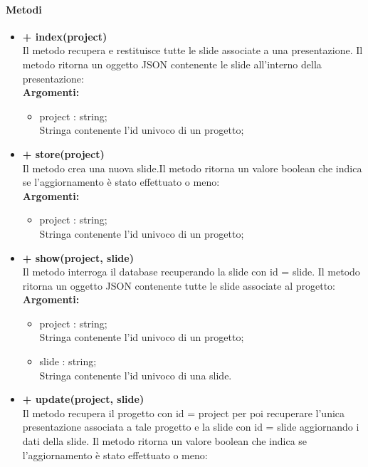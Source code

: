 	\paragraph{Metodi}
		\begin{itemize}
			\item \textbf{+ index(project)}\\
				Il metodo recupera e restituisce tutte le slide associate a una presentazione. Il metodo ritorna un oggetto JSON contenente le slide all'interno della presentazione:\\
				\textbf{Argomenti:}
				\begin{itemize}
					\item project : string; \\
					Stringa contenente l'id univoco di un progetto;
				\end{itemize}
			\item \textbf{+ store(project)}\\
				Il metodo crea una nuova slide.Il metodo ritorna un valore boolean che indica se l'aggiornamento è stato effettuato o meno:\\
				\textbf{Argomenti:}
				\begin{itemize}
					\item project : string; \\
					Stringa contenente l'id univoco di un progetto;
				\end{itemize}
			\item \textbf{+ show(project, slide)}\\
				Il metodo interroga il database recuperando la slide con id = slide. Il metodo ritorna un oggetto JSON contenente tutte le slide associate al progetto:\\
				\textbf{Argomenti:}
					\begin{itemize}
						\item project : string; \\
						Stringa contenente l'id univoco di un progetto;
						\item slide : string;\\
						Stringa contenente l'id univoco di una slide.
					\end{itemize}
			\item \textbf{+ update(project, slide)}\\
				Il metodo recupera il progetto con id = project per poi recuperare l'unica presentazione associata a tale progetto e la slide con id = slide aggiornando i dati della slide. Il metodo ritorna un valore boolean che indica se l'aggiornamento è stato effettuato o meno:\\

\end{itemize}
